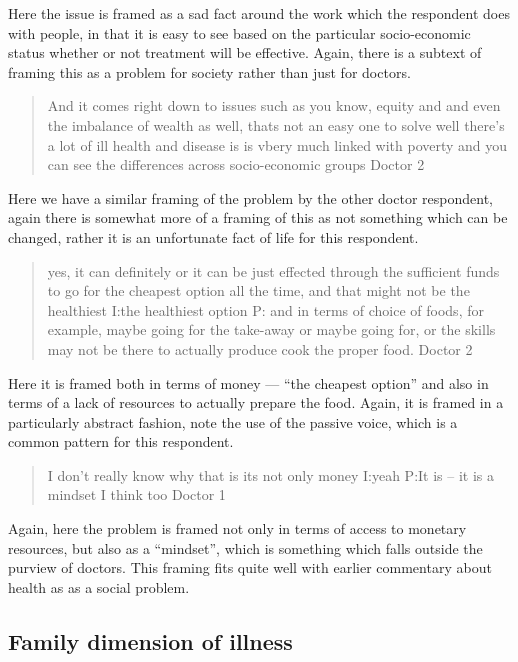 Here the issue is framed as a sad fact around the work which the respondent does with people, in that it is easy to see based on the particular socio-economic status whether or not treatment will be effective. Again, there is a subtext of framing this as a problem for society rather than just for doctors. 

\begin{quotation}
  And it comes right down to issues such as you know, equity and and even the imbalance of wealth as well, thats not an easy one to solve well there's a lot of ill health and disease is is vbery much linked with poverty and you can see the differences across socio-economic groups 
Doctor 2
\end{quotation}

Here we have a similar framing of the problem by the other doctor respondent, again there is somewhat more of a framing of this as not something which can be changed, rather it is an unfortunate fact of life for this respondent. 

\begin{quotation}
  yes, it can definitely or it can be just effected through the sufficient funds to go for the cheapest option all the time, and that might not be the healthiest
I:the healthiest option
P: and in terms of choice of foods, for example, maybe going for the take-away or maybe going for, or the skills may not be there to actually produce cook the proper food.
Doctor 2
\end{quotation}

Here it is framed both in terms of money --- ``the cheapest option'' and also in terms of a lack of resources to actually prepare the food. Again, it is framed in a particularly abstract fashion, note the use of the passive voice, which is a common pattern for this respondent. 

\begin{quotation}
   I don't really know why that is its not only money 
I:yeah
P:It is – it is a mindset I think too
Doctor 1
\end{quotation}
 Again, here the problem is framed not only in terms of access to monetary resources, but also as a ``mindset'', which is something which falls outside the purview of doctors. This framing fits quite well with earlier commentary about health as as a social problem. 

\subsection{Family dimension of illness}
\label{sec:family-dimens-illn}

